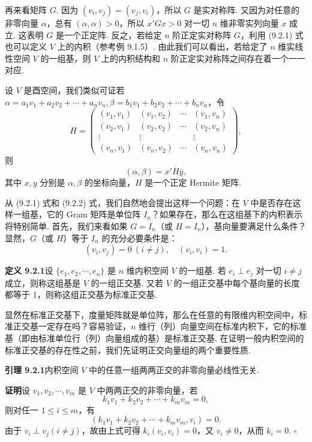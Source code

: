 \documentclass[UTF8,12pt,a4paper,fontset=fandol]{ctexart}
\begin{document}
再来看矩阵 $G$. 因为 $(v_i,v_j)=(v_j,v_i)$，所以 $G$ 是实对称阵. 又因为对任意的非零向量 $\alpha$，总有 $(\alpha,\alpha)>0$，所以 $x'Gx>0$ 对一切 $n$ 维非零实列向量 $x$ 成立. 这表明 $G$ 是一个正定阵. 反之，若给定 $n$ 阶正定实对称阵 $G$，利用 (9.2.1) 式也可以定义 $V$ 上的内积（参考例 9.1.5）. 由此我们可以看出，若给定了 $n$ 维实线性空间 $V$ 的一组基，则 $V$ 上的内积结构和 $n$ 阶正定实对称阵之间存在着一个一一对应.

设 $V$ 是酉空间，我们类似可证若 $\alpha=a_1v_1+a_2v_2+\cdots+a_nv_n,\beta=b_1v_1+b_2v_2+\cdots+b_nv_n$，令
\[
  H=
  \left(\begin{array}{cccc}
    (v_1,v_1) & (v_1,v_2) & \cdots & (v_1,v_n)\\
    (v_2,v_1) & (v_2,v_2) & \cdots & (v_2,v_n)\\
    \vdots & \vdots & & \vdots\\
    (v_n,v_1) & (v_n,v_2) & \cdots & (v_n,v_n)
  \end{array}\right),
\]
则
\begin{equation}
  (\alpha,\beta)=x'\overline H\overline y,
  \tag{9.2.2}
\end{equation}
其中 $x,y$ 分别是 $\alpha,\beta$ 的坐标向量，$H$ 是一个正定 Hermite 矩阵.

从 (9.2.1) 式和 (9.2.2) 式，我们自然地会提出这样一个问题：在 $V$ 中是否存在这样一组基，它的 Gram 矩阵是单位阵 $I_n$？如果存在，那么在这组基下的内积表示将特别简单. 首先，我们来看如果 $G=I_n$（或 $H=I_n$），基向量要满足什么条件？显然，$G$（或 $H$）等于 $I_n$ 的充分必要条件是：
\[
  (v_i,v_j)=0\ (i\ne j),\quad (v_i,v_i)=1.
\]

\noindent\textbf{定义 9.2.1}\quad 设 $\{e_1,e_2,\cdots,e_n\}$ 是 $n$ 维内积空间 $V$ 的一组基. 若 $e_i\perp e_j$ 对一切 $i\ne j$ 成立，则称这组基是 $V$ 的一组正交基. 又若 $V$ 的一组正交基中每个基向量的长度都等于 1，则称这组正交基为标准正交基.

显然在标准正交基下，度量矩阵就是单位阵，那么在任意的有限维内积空间中，标准正交基一定存在吗？容易验证，$n$ 维行（列）向量空间在标准内积下，它的标准基（即由标准单位行（列）向量组成的基）是标准正交基. 在证明一般内积空间的标准正交基的存在性之前，我们先证明正交向量组的两个重要性质.

\noindent\textbf{引理 9.2.1}\quad 内积空间 $V$ 中的任意一组两两正交的非零向量必线性无关.

\noindent\textbf{证明}\quad 设 $v_1,v_2,\cdots,v_m$ 是 $V$ 中两两正交的非零向量，若
\[
  k_1v_1+k_2v_2+\cdots+k_mv_m=0,
\]
则对任一 $1\le i\le m$，有
\[
  (k_1v_1+k_2v_2+\cdots+k_mv_m,v_i)=0.
\]
由于 $v_i\perp v_j(i\ne j)$，故由上式可得 $k_i(v_i,v_i)=0$，又 $v_i\ne0$，从而 $k_i=0$. $\square$
\end{document}
